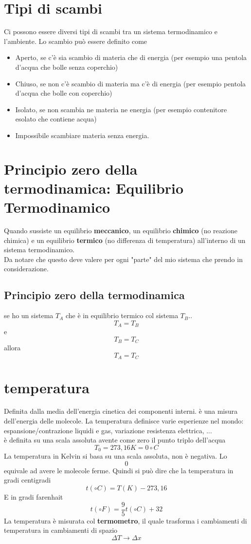 \documentclass[a4paper]{report}
\begin{document}
  \section{Tipi di scambi}
  Ci possono essere diversi tipi di scambi tra un sistema termodinamico e l'ambiente. Lo scambio può essere definito come
  \begin{itemize}
    \item Aperto, se c'è sia scambio di materia che di energia (per esempio una pentola d'acqua che bolle senza coperchio)
    \item Chiuso, se non c'è scambio di materia ma c'è di energia (per esempio pentola d'acqua che bolle con coperchio)
    \item Isolato, se non scambia ne materia ne energia (per esempio contenitore esolato che contiene acqua)
    \item Impossibile scambiare materia senza energia.
  \end{itemize}

  \section{Principio zero della termodinamica: Equilibrio Termodinamico}
  Quando sussiste un equilibrio \textbf{meccanico}, un equilibrio \textbf{chimico} (no reazione chimica) e un equilibrio \textbf{termico} (no differenza di temperatura) all'interno di un sistema termodinamico.\\
  Da notare che questo deve valere per ogni "parte" del mio sistema che prendo in considerazione.
  \subsection{Principio zero della termodinamica}
  se ho un sistema $T_A$ che è in equilibrio termico col sistema $T_B$..
  $$T_A = T_B$$
  e $$T_B = T_C$$
  allora $$T_A = T_C$$

  \section{temperatura}
  Definita dalla media dell'energia cinetica dei componenti interni. è una misura dell'energia delle molecole. La temperatura definisce varie esperienze nel mondo: espansione/contrazione liquidi e gas, variazione resistenza elettrica, ...\\
  è definita su una scala assoluta avente come zero il punto triplo dell'acqua
  $$T_0 = 273,16 K = 0 \circ C$$
  La temperatura in Kelvin si basa su una scala assoluta, non è negativa. Lo $$0$$ equivale ad avere le molecole ferme.
  Quindi si può dire che la temperatura in gradi centigradi
  $$ t(\circ C) = T(K) - 273,16$$
  E in gradi farenhait
  $$ t(\circ F) = \frac{9}{5} t(\circ C) + 32$$
  La temperatura è misurata col \textbf{termometro}, il quale trasforma i cambiamenti di temperatura in cambiamenti di spazio
  $$\Delta T \rightarrow \Delta x$$
\end{document}
